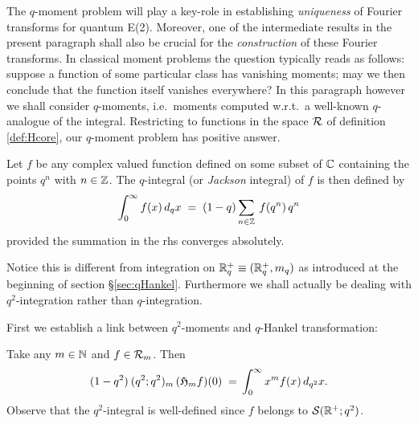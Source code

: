 
\begin{abs_chp}
The $q$-moment problem will play a key-role in establishing
{\em uniqueness\/} of Fourier transforms for quantum E(2).
Moreover, one of the intermediate results in the present paragraph shall
also be crucial for the {\em construction\/} of these Fourier transforms.
In classical moment problems the question typically reads as follows:
suppose a function of some particular class has vanishing moments;
may we then conclude that the function itself vanishes everywhere?
In this paragraph however we shall consider \mbox{$q$-moments},
i.e.\ moments computed w.r.t.\ a well-known $q$-analogue of the integral.
Restricting to functions in the space $\mathcal R$ of definition \ref{def:Hcore},
our $q$-moment problem has positive answer.
\end{abs_chp}


\begin{defn_sec} \label{def:Jackson_integral}
Let $f$ be any complex valued function defined on some subset of
$\mathbb{C}$ containing the points $q^{n}$ with $n\in \mathbb{Z}$.
The $q$-integral (or {\em Jackson\/} integral) of $f$ is then defined by
$$ \int_0^\infty f(x)\, d_q x  \;=\;  (1-q) \sum_{n\in \mathbb{Z}} \: f(q^{n}) \, q^{n} $$
provided the summation in the {\sc rhs} converges absolutely.
\end{defn_sec}


Notice this is different from integration on $\mathbb{R}_q^+ \equiv (\mathbb{R}_q^+,m_q)$
as introduced at the beginning of section \S \ref{sec:qHankel}\@.
Furthermore we shall actually be dealing with $q^2$-integration rather
than $q$-integration.
\vspace{2ex}

First we establish a link between $q^2$-moments and $q$-Hankel transformation:


\begin{prop_sec} \label{prop:moment:link_with_Hankel}
Take any\/ $m\in \mathbb{N}$ and\/ $f\in{\mathcal R}_{m}$. Then
$$ (1-q^2)\:(q^2;q^2)_m \, (\mathfrak{H}_{m}f)(0)
            \;=\, \int_0^\infty x^m f(x)\, d_{q^2}x.  $$
Observe that the\/ $q^2$-integral is well-defined since\/ $f$ belongs to\/ ${\mathcal S}(\mathbb{R}^+;q^2)$.
\end{prop_sec}

